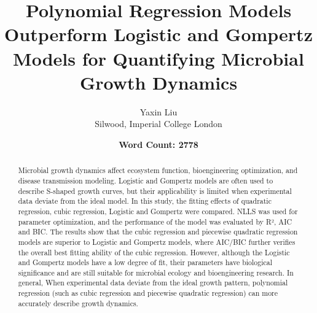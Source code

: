 \documentclass[11pt]{article}
\title{\textbf{Polynomial Regression Models Outperform Logistic and Gompertz Models for Quantifying Microbial Growth Dynamics}}
\author{Yaxin Liu \\Silwood, Imperial College London}
\date{\textbf{Word Count: 2778}}
\begin{document}
\maketitle
\newpage

\begin{abstract}
Microbial growth dynamics affect ecosystem function, bioengineering optimization, and disease transmission modeling. Logistic and Gompertz models are often used to describe S-shaped growth curves, but their applicability is limited when experimental data deviate from the ideal model. In this study, the fitting effects of quadratic regression, cubic regression, Logistic and Gompertz were compared. NLLS was used for parameter optimization, and the performance of the model was evaluated by R², AIC and BIC. The results show that the cubic regression and piecewise quadratic regression models are superior to Logistic and Gompertz models, where AIC/BIC further verifies the overall best fitting ability of the cubic regression. However, although the Logistic and Gompertz models have a low degree of fit, their parameters have biological significance and are still suitable for microbial ecology and bioengineering research. In general, When experimental data deviate from the ideal growth pattern, polynomial regression (such as cubic regression and piecewise quadratic regression) can more accurately describe growth dynamics.
\end{abstract}

\newpage
\end{document}
